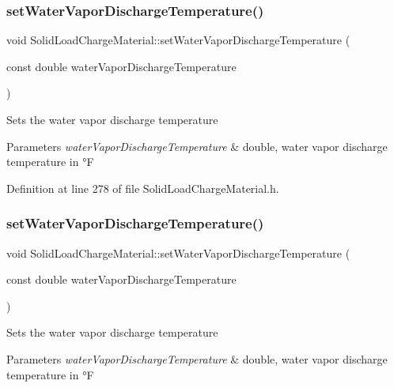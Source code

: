 \subsubsection{\texorpdfstring{set\+Water\+Vapor\+Discharge\+Temperature()}{setWaterVaporDischargeTemperature()}\hspace{0.1cm}{\footnotesize\ttfamily [2/3]}}
{\footnotesize\ttfamily void Solid\+Load\+Charge\+Material\+::set\+Water\+Vapor\+Discharge\+Temperature (\begin{DoxyParamCaption}\item[{const double}]{water\+Vapor\+Discharge\+Temperature }\end{DoxyParamCaption})\hspace{0.3cm}{\ttfamily [inline]}}

Sets the water vapor discharge temperature 
\begin{DoxyParams}{Parameters}
{\em water\+Vapor\+Discharge\+Temperature} & double, water vapor discharge temperature in °F \\
\hline
\end{DoxyParams}


Definition at line 278 of file Solid\+Load\+Charge\+Material.\+h.

\mbox{\label{class_solid_load_charge_material_af7837868e494c16aba5a2c3e1220106d}} 
\subsubsection{\texorpdfstring{set\+Water\+Vapor\+Discharge\+Temperature()}{setWaterVaporDischargeTemperature()}\hspace{0.1cm}{\footnotesize\ttfamily [3/3]}}
{\footnotesize\ttfamily void Solid\+Load\+Charge\+Material\+::set\+Water\+Vapor\+Discharge\+Temperature (\begin{DoxyParamCaption}\item[{const double}]{water\+Vapor\+Discharge\+Temperature }\end{DoxyParamCaption})\hspace{0.3cm}{\ttfamily [inline]}}

Sets the water vapor discharge temperature 
\begin{DoxyParams}{Parameters}
{\em water\+Vapor\+Discharge\+Temperature} & double, water vapor discharge temperature in °F \\
\hline
\end{DoxyParams}


